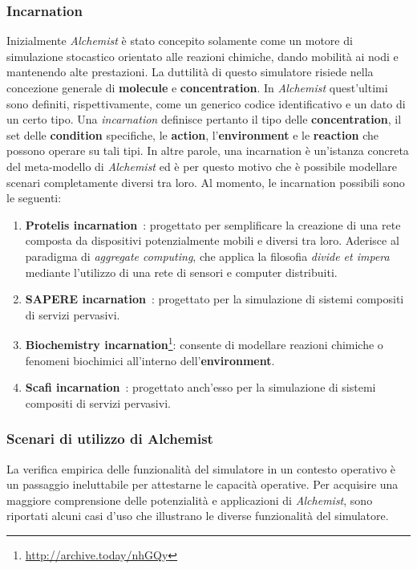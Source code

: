 \subsubsection{Incarnation}
Inizialmente \textit{Alchemist} è stato concepito solamente come un motore di simulazione stocastico orientato alle reazioni chimiche, dando mobilità ai nodi e mantenendo alte prestazioni. 
La duttilità di questo simulatore risiede nella concezione generale di \textbf{molecule} e \textbf{concentration}. In \textit{Alchemist} quest'ultimi sono definiti, rispettivamente, come un generico codice identificativo e un dato di un certo tipo. Una \textit{incarnation} definisce pertanto il tipo delle \textbf{concentration}, il set delle \textbf{condition} specifiche, le \textbf{action}, l'\textbf{environment} e le \textbf{reaction} che possono operare su tali tipi.
In altre parole, una incarnation è un'istanza concreta del meta-modello di \textit{Alchemist} ed è per questo motivo che è possibile modellare scenari completamente diversi tra loro.
Al momento, le incarnation possibili sono le seguenti:
\begin{enumerate}
	\item \textbf{Protelis incarnation}~\cite{Pianini2015}:  progettato per semplificare la creazione di una rete composta da dispositivi potenzialmente mobili e diversi tra loro. Aderisce al paradigma di \textit{aggregate computing}, che applica la filosofia \textit{divide et impera} mediante l'utilizzo di una rete di sensori e computer distribuiti.
	\item \textbf{SAPERE incarnation}~\cite{Zambonelli2015}: progettato per la simulazione di sistemi compositi di servizi pervasivi.
	\item \textbf{Biochemistry incarnation}\footnote{\url{http://archive.today/nhGQy}}: consente di modellare reazioni chimiche o fenomeni biochimici all'interno dell'\textbf{environment}.
	\item \textbf{Scafi incarnation}~\cite{Casadei2022}:  progettato anch'esso per la simulazione di sistemi compositi di servizi pervasivi.
\end{enumerate}

\subsubsection{Scenari di utilizzo di Alchemist}
La verifica empirica delle funzionalità del simulatore in un contesto operativo è un passaggio ineluttabile per attestarne le capacità operative. Per acquisire una maggiore comprensione delle potenzialità e applicazioni di \textit{Alchemist}, sono riportati alcuni casi d'uso che illustrano le diverse funzionalità del simulatore.

